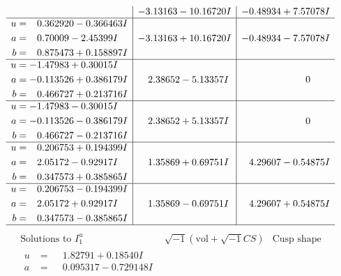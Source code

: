 \documentclass[1p]{elsarticle_modified}
\theoremstyle{definition}
\newcommand{\I}{\sqrt{-1}}
\begin{document}
$$\begin{array}{c|c|c}
 & -3.13163 - 10.16720 I & -0.48934 + 7.57078 I \\ \hline\begin{aligned}
u &= \phantom{-}0.362920 - 0.366463 I \\
a &= \phantom{-}0.70009 - 2.45399 I \\
b &= \phantom{-}0.875473 + 0.158897 I\end{aligned}
 & -3.13163 + 10.16720 I & -0.48934 - 7.57078 I \\ \hline\begin{aligned}
u &= -1.47983 + 0.30015 I \\
a &= -0.113526 + 0.386179 I \\
b &= \phantom{-}0.466727 + 0.213716 I\end{aligned}
 & \phantom{-}2.38652 - 5.13357 I & \phantom{-0.000000 } 0 \\ \hline\begin{aligned}
u &= -1.47983 - 0.30015 I \\
a &= -0.113526 - 0.386179 I \\
b &= \phantom{-}0.466727 - 0.213716 I\end{aligned}
 & \phantom{-}2.38652 + 5.13357 I & \phantom{-0.000000 } 0 \\ \hline\begin{aligned}
u &= \phantom{-}0.206753 + 0.194399 I \\
a &= \phantom{-}2.05172 - 0.92917 I \\
b &= \phantom{-}0.347573 + 0.385865 I\end{aligned}
 & \phantom{-}1.35869 + 0.69751 I & \phantom{-}4.29607 - 0.54875 I \\ \hline\begin{aligned}
u &= \phantom{-}0.206753 - 0.194399 I \\
a &= \phantom{-}2.05172 + 0.92917 I \\
b &= \phantom{-}0.347573 - 0.385865 I\end{aligned}
 & \phantom{-}1.35869 - 0.69751 I & \phantom{-}4.29607 + 0.54875 I\\
 \hline 
 \end{array}$$\newpage$$\begin{array}{c|c|c}  
\text{Solutions to }I^u_{1}& \I (\text{vol} + \sqrt{-1}CS) & \text{Cusp shape}\\
 \hline 
\begin{aligned}
u &= \phantom{-}1.82791 + 0.18540 I \\
a &= \phantom{-}0.095317 - 0.729148 I \\

\end{aligned}
\end{array}$$
\end{document}
